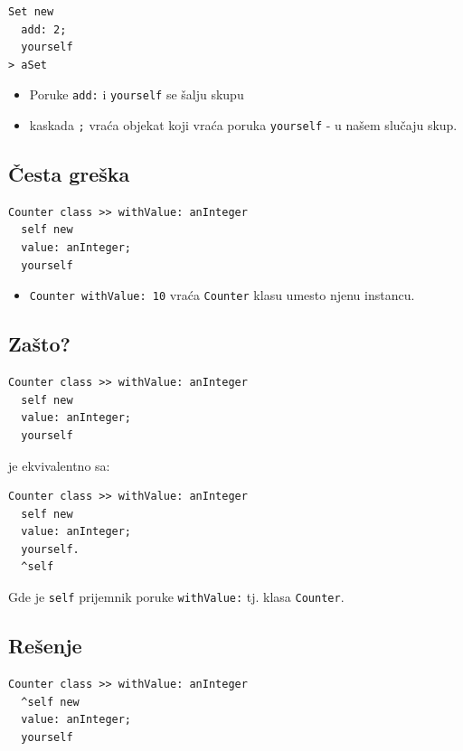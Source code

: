 \documentclass[presentation]{beamer}
\begin{document}
\begin{verbatim}
Set new
  add: 2;
  yourself
> aSet
\end{verbatim}

\begin{itemize}
\item Poruke \texttt{add:} i \texttt{yourself} se šalju skupu
\item kaskada \texttt{;} vraća objekat koji vraća poruka \texttt{yourself} - u našem slučaju skup.
\end{itemize}

\subsection{Česta greška}
\label{sec:org22940da}

\begin{verbatim}
Counter class >> withValue: anInteger
  self new
  value: anInteger;
  yourself
\end{verbatim}

\begin{itemize}
\item \texttt{Counter withValue: 10} vraća \texttt{Counter} klasu umesto njenu instancu.
\end{itemize}

\subsection{Zašto?}
\label{sec:org909479e}

\begin{verbatim}
Counter class >> withValue: anInteger
  self new
  value: anInteger;
  yourself
\end{verbatim}

je ekvivalentno sa:

\begin{verbatim}
Counter class >> withValue: anInteger
  self new
  value: anInteger;
  yourself.
  ^self
\end{verbatim}

Gde je \texttt{self} prijemnik poruke \texttt{withValue:} tj. klasa \texttt{Counter}.

\subsection{Rešenje}
\label{sec:org35f1e32}

\begin{verbatim}
Counter class >> withValue: anInteger
  ^self new
  value: anInteger;
  yourself
\end{verbatim}
\end{document}
